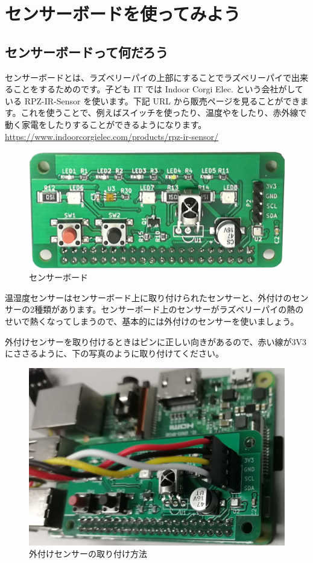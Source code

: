 \section{センサーボードを使ってみよう}
\subsection{センサーボードって何だろう}

センサーボードとは、ラズベリーパイの上部にすることでラズベリーパイで出来ることをするためのです。子ども IT では Indoor Corgi Elec. という会社がしている RPZ-IR-Sensor を使います。下記 URL から販売ページを見ることができます。これを使うことで、例えばスイッチを使ったり、温度やをしたり、赤外線で動く家電をしたりすることができるようになります。\\
\url{https://www.indoorcorgielec.com/products/rpz-ir-sensor/}\\

\begin{figure}[H]
    \centering
    \includegraphics[width=0.6\linewidth]{images/chap03/text03-img030.png}
    \caption{センサーボード}
\end{figure}

温湿度センサーはセンサーボード上に取り付けられたセンサーと、外付けのセンサーの2種類があります。センサーボード上のセンサーがラズベリーパイの熱のせいで熱くなってしまうので、基本的には外付けのセンサーを使いましょう。

外付けセンサーを取り付けるときはピンに正しい向きがあるので、赤い線が3V3にささるように、下の写真のように取り付けてください。

\begin{figure}[H]
    \centering
    \includegraphics[width=0.6\linewidth]{images/chap03/text03-img034.jpg}
    \caption{外付けセンサーの取り付け方法}
\end{figure}

